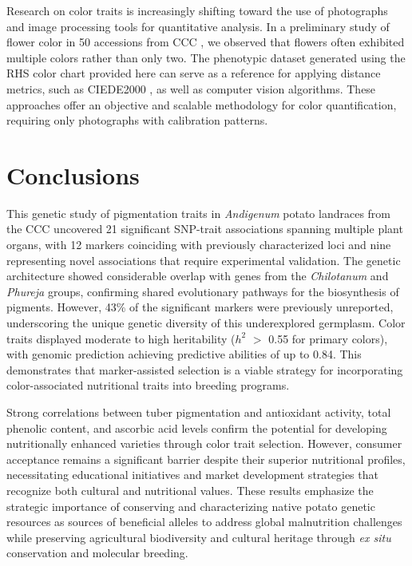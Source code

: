 \documentclass[pdflatex,sn-mathphys-ay]{sn-jnl}%
\begin{document}
Research on color traits is increasingly shifting toward the use of photographs and image processing tools for quantitative analysis. In a preliminary study of flower color in 50 accessions from CCC \citep{Lopez2024}, we observed that flowers often exhibited multiple colors rather than only two. The phenotypic dataset generated using the RHS color chart provided here can serve as a reference for applying distance metrics, such as CIEDE2000 \citep{tao2020smartphone}, as well as computer vision algorithms. These approaches offer an objective and scalable methodology for color quantification, requiring only photographs with calibration patterns.


\section{Conclusions}

This genetic study of pigmentation traits in \textit{Andigenum} potato landraces from the CCC uncovered 21 significant SNP-trait associations spanning multiple plant organs, with 12 markers coinciding with previously characterized loci and nine representing novel associations that require experimental validation. The genetic architecture showed considerable overlap with genes from the \textit{Chilotanum} and \textit{Phureja} groups, confirming shared evolutionary pathways for the biosynthesis of pigments. However, 43\% of the significant markers were previously unreported, underscoring the unique genetic diversity of this underexplored germplasm. Color traits displayed moderate to high heritability ($h^2$ $>$ 0.55 for primary colors), with genomic prediction achieving predictive abilities of up to 0.84. This demonstrates that marker-assisted selection is a viable strategy for incorporating color-associated nutritional traits into breeding programs.


Strong correlations between tuber pigmentation and antioxidant activity, total phenolic content, and ascorbic acid levels confirm the potential for developing nutritionally enhanced varieties through color trait selection. However, consumer acceptance remains a significant barrier despite their superior nutritional profiles, necessitating educational initiatives and market development strategies that recognize both cultural and nutritional values. These results emphasize the strategic importance of conserving and characterizing native potato genetic resources as sources of beneficial alleles to address global malnutrition challenges while preserving agricultural biodiversity and cultural heritage through \textit{ex situ} conservation and molecular breeding.
\end{document}
